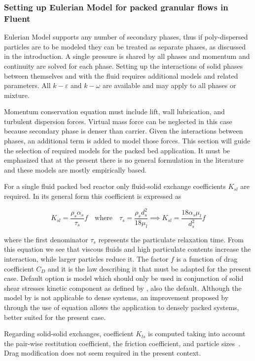 \subsubsection{Setting up Eulerian Model for packed granular flows in Fluent}

Eulerian Model supports any number of secondary phases, thus if poly-dispersed particles are to be modeled they can be treated as separate phases, as discussed in the introduction. A single pressure is shared by all phases and momentum and continuity are solved for each phase. Setting up the interactions of solid phases between themselves and with the fluid requires additional models and related parameters. All $k-\varepsilon$ and $k-\omega$ are available and may apply to all phases or mixture.

Momentum conservation equation must include lift, wall lubrication, and turbulent dispersion forces. Virtual mass force can be neglected in this case because secondary phase is denser than carrier. Given the interactions between phases, an additional term is added to model those forces. This section will guide the selection of required models for the packed bed application. It must be emphasized that at the present there is no general formulation in the literature and these models are mostly empirically based.

For a single fluid packed bed reactor only fluid-solid exchange coefficients $K_{sl}$ are required. In its general form this coefficient is expressed as

\begin{equation}
K_{sl}=\frac{\rho_{s}\alpha_{s}}{\tau_{s}}f\quad\text{where}\quad\tau_{s}=\frac{\rho_{s}d_{s}^{2}}{18\mu_{l}}\implies{}K_{sl}=\frac{18\alpha_{s}\mu_{l}}{d_{s}^{2}}f
\end{equation}

\noindent{}where the first denominator $\tau_{s}$ represents the particulate relaxation time. From this equation we see that viscous fluids and high particulate contents increase the interaction, while larger particles reduce it. The factor $f$ is a function of drag coefficient $C_{D}$ and it is the law describing it that must be adapted for the present case. Default option is \textcite{Syamlal1989} model which should only be used in conjunction of solid shear stresses kinetic component as defined by \textcite{Syamlal1993}, also the default. Although the model by \textcite{Wen1966} is not applicable to dense systems, an improvement proposed by \textcite{Gidaspow1992} through the use of \textcite{Ergun1952} equation allows the application to densely packed systems, better suited for the present case.

Regarding solid-solid exchanges, coefficient $K_{ls}$ is computed taking into account the pair-wise restitution coefficient, the friction coefficient, and particle sizes~\cite{Syamlal1987b}. Drag modification does not seem required in the present context.


\endinput